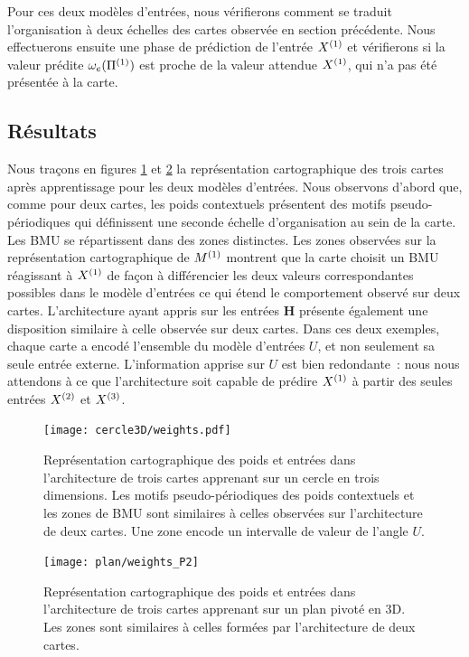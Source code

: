 \documentclass[../main]{subfiles}
\begin{document}
Pour ces deux modèles d'entrées, nous vérifierons comment se traduit l'organisation à deux échelles des cartes observée en section précédente.
Nous effectuerons ensuite une phase de prédiction de l'entrée $X^{({1})}$ et vérifierons si la valeur prédite $\omega_{e}(\Pi^{({1})})$ est proche de la valeur attendue $X^{({1})}$, qui n'a pas été présentée à la carte.


\subsection{Résultats}

Nous traçons en figures \ref{fig:w_cercle} et \ref{fig:w_plan3} la représentation cartographique des trois cartes après apprentissage pour les deux modèles d'entrées.
Nous observons d'abord que, comme pour deux cartes, les poids contextuels présentent des motifs pseudo-périodiques qui définissent une seconde échelle d'organisation au sein de la carte.
Les BMU se répartissent dans des zones distinctes. 
Les zones observées sur la représentation cartographique de $M^{({1})}$ montrent que la carte choisit un BMU réagissant à $X^{({1})}$ de façon à différencier les deux valeurs correspondantes possibles dans le modèle d'entrées  ce qui étend le comportement observé sur deux cartes.
L'architecture ayant appris sur les entrées \textbf{H} présente également une disposition similaire à celle observée sur deux cartes.
Dans ces deux exemples, chaque carte a encodé l'ensemble du modèle d'entrées $U$, et non seulement sa seule entrée externe. L'information apprise sur $U$ est bien redondante~: nous nous attendons à ce que l'architecture soit capable de prédire $X^{({1})}$ à partir des seules entrées $X^{({2})}$ et $X^{({3})}$.


\begin{figure}[h!]
	\centering\texttt{[image: cercle3D/weights.pdf]}
	\caption{Représentation cartographique des poids et entrées dans l'architecture de trois cartes apprenant sur un cercle en trois dimensions. Les motifs pseudo-périodiques des poids contextuels et les zones de BMU sont similaires à celles observées sur l'architecture de deux cartes. Une zone encode un intervalle de valeur de l'angle $U$. \label{fig:w_cercle}}
\end{figure}

\begin{figure}[h!]
	\centering\texttt{[image: plan/weights\_P2]}
	\caption{Représentation cartographique des poids et entrées dans l'architecture de trois cartes apprenant sur un plan pivoté en 3D. Les zones sont similaires à celles formées par l'architecture de deux cartes. \label{fig:w_plan3}}
\end{figure}
\end{document}
